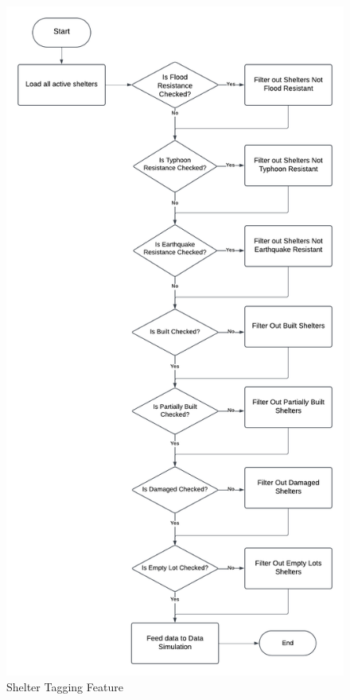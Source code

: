 \begin{appendices}
\begin{centerappendixtitle}
		\begin{figure}[h]
			\centering
			\caption{Shelter Tagging Feature}
			\label{shelTagFlow}
			\includegraphics[width=\textwidth,height=\textheight,keepaspectratio]{appendix/sheltertag f}
		\end{figure}
		

\end{centerappendixtitle}
\end{appendices}

